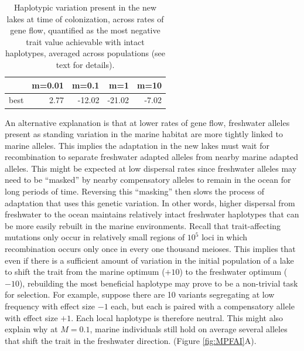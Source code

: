 \documentclass{article}
\newcommand{\plr}[1]{\todo[linecolor=blue,backgroundcolor=blue!25,bordercolor=blue]{#1}}
\begin{document}
\begin{table}[ht]
    \centering
    \begin{tabular}{rrrrr}
      \hline
     & m=0.01 & m=0.1 & m=1 & m=10 \\ 
      \hline
          best & 2.77 & -12.02 & -21.02 & -7.02 \\ 
       \hline
    \end{tabular}
    \caption{
        Haplotypic variation present in the new lakes at time of colonization,
        across rates of gene flow,
        quantified as the most negative trait value achievable
            with intact haplotypes, averaged across populations
            (see text for details).
    } \label{tab:linkage}
\end{table}

An alternative explanation is that at lower rates of gene flow,
freshwater alleles present as standing variation in the marine habitat
are more tightly linked to marine alleles.
This implies the adaptation in the new lakes must wait for recombination 
to separate freshwater adapted alleles from nearby marine adapted alleles.
This might be expected at low dispersal rates since freshwater alleles 
may need to be ``masked'' by nearby compensatory alleles
to remain in the ocean for long periods of time.
Reversing this ``masking'' then slows the process of adaptation that uses this genetic variation.
\plr{cite \citet{yeaman2011genetic}?}
In other words, higher dispersal from freshwater to the ocean maintains relatively intact freshwater haplotypes
that can be more easily rebuilt in the marine environments.
Recall that trait-affecting mutations only occur in relatively small regions of $10^5$ loci
in which recombination occurs only once in every one thousand meioses.
This implies that even if there is a sufficient amount of variation in the initial population of a lake
to shift the trait from the marine optimum ($+10$) to the freshwater optimum ($-10$),
rebuilding the most beneficial haplotype may prove to be a non-trivial task for selection.
For example, suppose there are 10 variants segregating at low frequency with effect size $-1$ each,
but each is paired with a compensatory allele with effect size $+1$.
Each local haplotype is therefore neutral.
This might also explain why at $M=0.1$,
marine individuals still hold on average several alleles that shift the trait in the freshwater direction.
(Figure \ref{fig:MPFAI}A).
\end{document}
